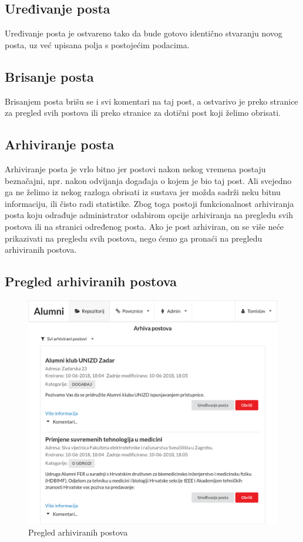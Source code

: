 \documentclass[zavrsni, numeric]{fer}
\begin{document}
\subsection{Uređivanje posta}
Uređivanje posta je ostvareno tako da bude gotovo identično stvaranju novog posta, uz već upisana polja s postojećim podacima.

\subsection{Brisanje posta}
Brisanjem posta brišu se i svi komentari na taj post, a ostvarivo je preko stranice za pregled svih postova ili preko stranice za dotični post koji želimo obrisati.

\subsection{Arhiviranje posta}
Arhiviranje posta je vrlo bitno jer postovi nakon nekog vremena postaju beznačajni, npr. nakon odvijanja događaja o kojem je bio taj post. Ali svejedno ga ne želimo iz nekog razloga obrisati iz sustava jer možda sadrži neku bitnu informaciju, ili čisto radi statistike. Zbog toga postoji funkcionalnost arhiviranja posta koju odrađuje administrator odabirom opcije arhiviranja na pregledu svih postova ili na stranici određenog posta. Ako je post arhiviran, on se više neće prikazivati na pregledu svih postova, nego ćemo ga pronaći na pregledu arhiviranih postova.

\subsection{Pregled arhiviranih postova}

\begin{figure}[H]
	\centering
	\includegraphics[width=13cm]{slike/arhivirani-postovi.png}
	\caption{Pregled arhiviranih postova}
	\label{fig:arhivirani-postovi}
\end{figure}
\end{document}

